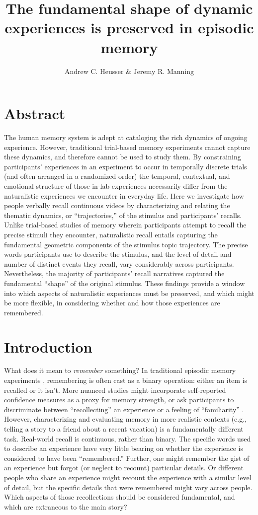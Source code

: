 \documentclass{article}
\title{The fundamental shape of dynamic experiences is preserved in episodic memory}
\author{Andrew C. Heusser \& Jeremy R. Manning}
\begin{document}
\maketitle

\section{Abstract}
{
The human memory system is adept at cataloging the rich dynamics of ongoing experience. However, traditional trial-based memory experiments cannot capture these dynamics, and therefore cannot be used to study them.  By constraining participants' experiences in an experiment to occur in temporally discrete trials (and often arranged in a randomized order) the temporal, contextual, and emotional structure of those in-lab experiences necessarily differ from the naturalistic experiences we encounter in everyday life.  Here we investigate how people verbally recall continuous videos by characterizing and relating the thematic dynamics, or ``trajectories,'' of the stimulus and participants' recalls.  Unlike trial-based studies of memory wherein participants attempt to recall the precise stimuli they encounter, naturalistic recall entails capturing the fundamental geometric components of the stimulus topic trajectory.  The precise words participants use to describe the stimulus, and the level of detail and number of distinct events they recall, vary considerably across participants.  Nevertheless, the majority of participants' recall narratives captured the fundamental ``shape'' of the original stimulus.  These findings provide a window into which aspects of naturalistic experiences must be preserved, and which might be more flexible, in considering whether and how those experiences are remembered.

\section{Introduction}

What does it mean to \textit{remember} something? In traditional episodic memory experiments \citep[e.g., list-learning or trial-based experiments;][]{Murd62a, Kaha96}, remembering is often cast as a binary operation: either an item is recalled or it isn't. More nuanced studies might incorporate self-reported confidence measures as a proxy for memory strength, or ask participants to discriminate between ``recollecting'' an experience or a feeling of ``familiarity'' \citep{Yone02}. However, characterizing and evaluating memory in more realistic contexts (e.g., telling a story to a friend about a recent vacation) is a fundamentally different task. Real-world recall is continuous, rather than binary.  The specific words used to describe an experience have very little bearing on whether the experience is considered to have been ``remembered.''  Further, one might remember the gist of an experience but forgot (or neglect to recount) particular details.  Or different people who share an experience might recount the experience with a similar level of detail, but the specific details that were remembered might vary across people.  Which aspects of those recollections should be considered fundamental, and which are extraneous to the main story?

}
\end{document}
